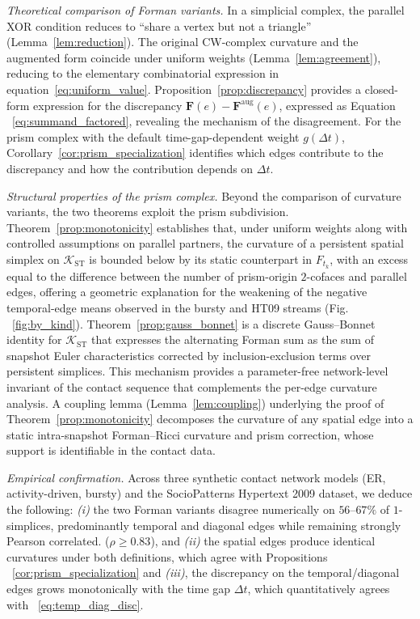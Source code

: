 \documentclass[
    pre,
    twocolumn,
    superscriptaddress,
    showpacs,
    nofootinbib,
    amsmath,
    amssymb,
    floatfix
]{revtex4-2}
\newcommand{\K}{\mathcal{K}}
\newcommand{\F}{\mathbf{F}}        %
\newcommand{\Faug}{\F^{\mathrm{aug}}}
\newcommand{\dt}{\Delta t}
\theoremstyle{plain} %
\theoremstyle{definition} %
\begin{document}
\textit{Theoretical comparison of Forman variants.}  In a simplicial complex, the parallel XOR condition reduces to
``share a vertex but not a triangle'' (Lemma~\ref{lem:reduction}). The original CW-complex curvature \cite{Forman2003} and the augmented form \cite{Sreejith2016} coincide under uniform weights (Lemma~\ref{lem:agreement}), reducing to the elementary combinatorial expression in equation~\eqref{eq:uniform_value}.
Proposition~\ref{prop:discrepancy} provides a closed-form expression for the discrepancy $\F(e)-\Faug(e)$, expressed as Equation ~\eqref{eq:summand_factored}, revealing the mechanism of the disagreement.
For the prism complex with the default time-gap-dependent weight $g(\dt)$, Corollary~\ref{cor:prism_specialization} identifies which edges contribute to the discrepancy and how the contribution depends on $\dt$.

\textit{Structural properties of the prism complex.}
Beyond the comparison of curvature variants, the two theorems exploit the prism subdivision.
Theorem~\ref{prop:monotonicity} establishes that, under uniform weights along with controlled assumptions on parallel partners, the curvature of a persistent spatial simplex on $\K_{\mathrm{ST}}$ is bounded below by its static counterpart in $F_{t_k}$, with an excess equal to the difference between the number of prism-origin $2$-cofaces and parallel edges, offering a geometric explanation for the weakening of the negative temporal-edge means observed in the bursty and HT09 streams (Fig. ~\ref{fig:by_kind}).
Theorem~\ref{prop:gauss_bonnet} is a discrete Gauss--Bonnet identity for $\K_{\mathrm{ST}}$ that expresses the alternating Forman sum as the sum of snapshot Euler characteristics corrected by inclusion-exclusion terms over persistent simplices. This mechanism provides a parameter-free network-level invariant of the contact sequence that complements the per-edge curvature analysis.
A coupling lemma (Lemma~\ref{lem:coupling}) underlying the proof of Theorem~\ref{prop:monotonicity} decomposes the curvature of any spatial edge into a static intra-snapshot Forman--Ricci curvature and prism correction, whose support is identifiable in the contact data.

\textit{Empirical confirmation.}  Across three synthetic
contact network models (ER, activity-driven, bursty) and the
SocioPatterns Hypertext 2009 dataset, we deduce the following:
\textit{(i)} the two Forman variants disagree numerically on
$56$--$67\%$ of $1$-simplices, predominantly temporal and
diagonal edges while remaining strongly Pearson correlated.
($\rho\geq 0.83$), and \textit{(ii)} the spatial edges produce identical
curvatures under both definitions, which agree with
Propositions ~\ref{cor:prism_specialization} and \textit{(iii)}, the discrepancy
on the temporal/diagonal edges grows monotonically with the time gap
$\dt$, which quantitatively agrees with ~\eqref{eq:temp_diag_disc}.
\end{document}
